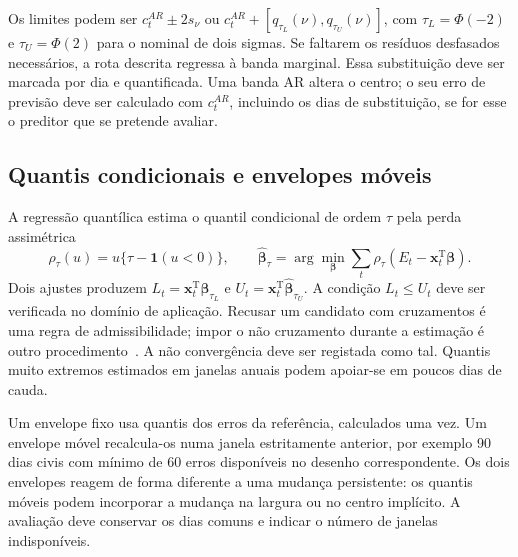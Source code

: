 Os limites podem ser $c_t^{AR}\pm2s_\nu$ ou $c_t^{AR}+[q_{\tau_L}(\nu),q_{\tau_U}(\nu)]$, com $\tau_L=\Phi(-2)$ e $\tau_U=\Phi(2)$ para o nominal de dois sigmas. Se faltarem os resíduos desfasados necessários, a rota descrita regressa à banda marginal. Essa substituição deve ser marcada por dia e quantificada. Uma banda AR altera o centro; o seu erro de previsão deve ser calculado com $c_t^{AR}$, incluindo os dias de substituição, se for esse o preditor que se pretende avaliar.

\subsection{Quantis condicionais e envelopes móveis}
\label{sec:mat-quantis}
A regressão quantílica estima o quantil condicional de ordem $\tau$ pela perda assimétrica~\parencite{KoenkerBassett1978}
\begin{equation}
\rho_\tau(u)=u\{\tau-\mathbf1(u<0)\},
\qquad \widehat{\boldsymbol\beta}_\tau
=\arg\min_{\boldsymbol\beta}\sum_t\rho_\tau(E_t-\boldsymbol x_t^{\mathrm T}\boldsymbol\beta).
\label{eq:mat-quantil}
\end{equation}
Dois ajustes produzem $L_t=\boldsymbol x_t^{\mathrm T}\widehat{\boldsymbol\beta}_{\tau_L}$ e $U_t=\boldsymbol x_t^{\mathrm T}\widehat{\boldsymbol\beta}_{\tau_U}$. A condição $L_t\leq U_t$ deve ser verificada no domínio de aplicação. Recusar um candidato com cruzamentos é uma regra de admissibilidade; impor o não cruzamento durante a estimação é outro procedimento~\parencite{Chernozhukov2010}. A não convergência deve ser registada como tal. Quantis muito extremos estimados em janelas anuais podem apoiar-se em poucos dias de cauda.

Um envelope fixo usa quantis dos erros da referência, calculados uma vez. Um envelope móvel recalcula-os numa janela estritamente anterior, por exemplo 90 dias civis com mínimo de 60 erros disponíveis no desenho correspondente. Os dois envelopes reagem de forma diferente a uma mudança persistente: os quantis móveis podem incorporar a mudança na largura ou no centro implícito. A avaliação deve conservar os dias comuns e indicar o número de janelas indisponíveis.


